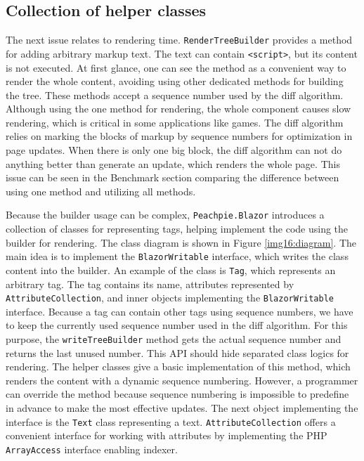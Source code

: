 \subsection{Collection of helper classes}

The next issue relates to rendering time.
\texttt{RenderTreeBuilder} provides a method for adding arbitrary markup text.
The text can contain \texttt{<script>}, but its content is not executed.
At first glance, one can see the method as a convenient way to render the whole content, avoiding using other dedicated methods for building the tree.
These methods accept a sequence number used by the diff algorithm. 
Although using the one method for rendering, the whole component causes slow rendering, which is critical in some applications like games.
The diff algorithm relies on marking the blocks of markup by sequence numbers for optimization in page updates.
When there is only one big block, the diff algorithm can not do anything better than generate an update, which renders the whole page. 
This issue can be seen in the Benchmark section comparing the difference between using one method and utilizing all methods.
\par
Because the builder usage can be complex, \texttt{Peachpie.Blazor} introduces a collection of classes for representing tags, helping implement the code using the builder for rendering.
The class diagram is shown in Figure \ref{img16:diagram}.
The main idea is to implement the \texttt{BlazorWritable} interface, which writes the class content into the builder.
An example of the class is \texttt{Tag}, which represents an arbitrary tag.
The tag contains its name, attributes represented by \texttt{AttributeCollection}, and inner objects implementing the \texttt{BlazorWritable} interface.
Because a tag can contain other tags using sequence numbers, we have to keep the currently used sequence number used in the diff algorithm.
For this purpose, the \texttt{writeTreeBuil\-der} method gets the actual sequence number and returns the last unused number.
This API should hide separated class logics for rendering.
The helper classes give a basic implementation of this method, which renders the content with a dynamic sequence numbering. 
However, a programmer can override the method because sequence numbering is impossible to predefine in advance to make the most effective updates.
The next object implementing the interface is the \texttt{Text} class representing a text.
\texttt{AttributeCollection} offers a convenient interface for working with attributes by implementing the PHP \texttt{ArrayAccess} interface enabling indexer.
